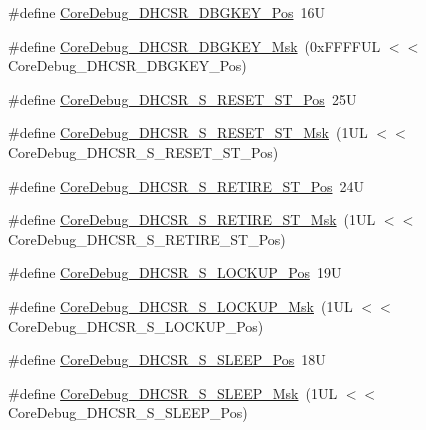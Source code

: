 \begin{DoxyCompactItemize}
\item 
\#define \hyperlink{group___c_m_s_i_s___core_debug_gac91280edd0ce932665cf75a23d11d842}{Core\+Debug\+\_\+\+D\+H\+C\+S\+R\+\_\+\+D\+B\+G\+K\+E\+Y\+\_\+\+Pos}~16U
\item 
\#define \hyperlink{group___c_m_s_i_s___core_debug_ga1ce997cee15edaafe4aed77751816ffc}{Core\+Debug\+\_\+\+D\+H\+C\+S\+R\+\_\+\+D\+B\+G\+K\+E\+Y\+\_\+\+Msk}~(0x\+F\+F\+F\+F\+U\+L $<$$<$ Core\+Debug\+\_\+\+D\+H\+C\+S\+R\+\_\+\+D\+B\+G\+K\+E\+Y\+\_\+\+Pos)
\item 
\#define \hyperlink{group___c_m_s_i_s___core_debug_ga6f934c5427ea057394268e541fa97753}{Core\+Debug\+\_\+\+D\+H\+C\+S\+R\+\_\+\+S\+\_\+\+R\+E\+S\+E\+T\+\_\+\+S\+T\+\_\+\+Pos}~25U
\item 
\#define \hyperlink{group___c_m_s_i_s___core_debug_gac474394bcceb31a8e09566c90b3f8922}{Core\+Debug\+\_\+\+D\+H\+C\+S\+R\+\_\+\+S\+\_\+\+R\+E\+S\+E\+T\+\_\+\+S\+T\+\_\+\+Msk}~(1\+U\+L $<$$<$ Core\+Debug\+\_\+\+D\+H\+C\+S\+R\+\_\+\+S\+\_\+\+R\+E\+S\+E\+T\+\_\+\+S\+T\+\_\+\+Pos)
\item 
\#define \hyperlink{group___c_m_s_i_s___core_debug_ga2328118f8b3574c871a53605eb17e730}{Core\+Debug\+\_\+\+D\+H\+C\+S\+R\+\_\+\+S\+\_\+\+R\+E\+T\+I\+R\+E\+\_\+\+S\+T\+\_\+\+Pos}~24U
\item 
\#define \hyperlink{group___c_m_s_i_s___core_debug_ga89dceb5325f6bcb36a0473d65fbfcfa6}{Core\+Debug\+\_\+\+D\+H\+C\+S\+R\+\_\+\+S\+\_\+\+R\+E\+T\+I\+R\+E\+\_\+\+S\+T\+\_\+\+Msk}~(1\+U\+L $<$$<$ Core\+Debug\+\_\+\+D\+H\+C\+S\+R\+\_\+\+S\+\_\+\+R\+E\+T\+I\+R\+E\+\_\+\+S\+T\+\_\+\+Pos)
\item 
\#define \hyperlink{group___c_m_s_i_s___core_debug_ga2900dd56a988a4ed27ad664d5642807e}{Core\+Debug\+\_\+\+D\+H\+C\+S\+R\+\_\+\+S\+\_\+\+L\+O\+C\+K\+U\+P\+\_\+\+Pos}~19U
\item 
\#define \hyperlink{group___c_m_s_i_s___core_debug_ga7b67e4506d7f464ef5dafd6219739756}{Core\+Debug\+\_\+\+D\+H\+C\+S\+R\+\_\+\+S\+\_\+\+L\+O\+C\+K\+U\+P\+\_\+\+Msk}~(1\+U\+L $<$$<$ Core\+Debug\+\_\+\+D\+H\+C\+S\+R\+\_\+\+S\+\_\+\+L\+O\+C\+K\+U\+P\+\_\+\+Pos)
\item 
\#define \hyperlink{group___c_m_s_i_s___core_debug_ga349ccea33accc705595624c2d334fbcb}{Core\+Debug\+\_\+\+D\+H\+C\+S\+R\+\_\+\+S\+\_\+\+S\+L\+E\+E\+P\+\_\+\+Pos}~18U
\item 
\#define \hyperlink{group___c_m_s_i_s___core_debug_ga98d51538e645c2c1a422279cd85a0a25}{Core\+Debug\+\_\+\+D\+H\+C\+S\+R\+\_\+\+S\+\_\+\+S\+L\+E\+E\+P\+\_\+\+Msk}~(1\+U\+L $<$$<$ Core\+Debug\+\_\+\+D\+H\+C\+S\+R\+\_\+\+S\+\_\+\+S\+L\+E\+E\+P\+\_\+\+Pos)
$$
\end{DoxyCompactItemize}
